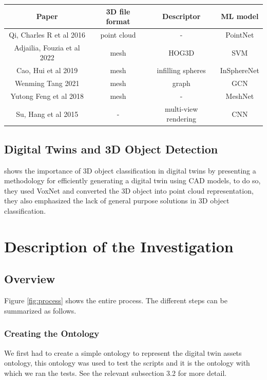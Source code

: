 \documentclass[a4paper,11pt,oneside]{article}
\begin{document}
\begin{center}
\begin{tabular}{|c|c|c|c|}
\hline
\textbf{Paper} & \textbf{3D file format} & \textbf{Descriptor} & \textbf{ML model} \\
\hline
Qi, Charles R et al 2016 \cite{qi2016pointnet} & point cloud & - & PointNet \\
\hline
Adjailia, Fouzia et al 2022 \cite{10.1007/978-981-16-5348-3_36} & mesh & HOG3D & SVM \\
\hline
Cao, Hui et al 2019 \cite{https://doi.org/10.48550/arxiv.1912.11606} & mesh & infilling spheres & InSphereNet \\
\hline
Wenming Tang 2021 \cite{https://doi.org/10.48550/arxiv.2106.15778} & mesh & graph & GCN \\
\hline
Yutong Feng et al 2018 \cite{feng2019meshnet}  & mesh & - & MeshNet \\
\hline
Su, Hang et al 2015 \cite{https://doi.org/10.48550/arxiv.1505.00880}  & - & multi-view rendering & CNN\\
\hline


\end{tabular}
\end{center}

	\subsection{Digital Twins and 3D Object Detection}
	\cite{objectdetectionDT} shows the importance of 3D object classification in digital twins by presenting a methodology for efficiently generating a digital twin using CAD models, to do so, they used VoxNet \cite{7353481} and converted the 3D object into point cloud representation, they also emphasized the lack of general purpose solutions in 3D object classification.
  \section{Description of the Investigation}
  \subsection{Overview}
  Figure \ref{fig:process} shows the entire process. The different steps can be summarized as follows.
  
  \subsubsection{Creating the Ontology}
  We first had to create a simple ontology to represent the digital twin assets ontology, this ontology was used to test the scripts and it is the ontology with which we ran the tests. See the relevant subsection 3.2 for more detail.
\end{document}
